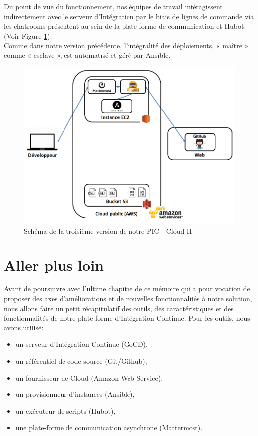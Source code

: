       Du point de vue du fonctionnement, nos équipes de travail intéragissent indirectement avec le serveur d'Intégration par le biais de lignes de commande via les chatrooms présentent au sein de la plate-forme de communication et Hubot (Voir Figure \ref{PICv3}).\\

      Comme dans notre version précédente, l'intégralité des déploiements, « maître » comme « esclave », est automatisé et géré par Ansible.

      \begin{figure}
        \begin{center}
          \includegraphics[scale=0.5]{images/PICv3.png}
        \end{center}
        \caption{Schéma de la troisième version de notre PIC - Cloud II}
        \label{PICv3}
      \end{figure}

      \section{Aller plus loin}
      Avant de poursuivre avec l'ultime chapitre de ce mémoire qui a pour vocation de proposer des axes d'améliorations et de nouvelles fonctionnalités à notre solution, nous allons faire un petit récapitulatif des outils, des caractéristiques et des fonctionnalités de notre plate-forme d'Intégration Continue. Pour les outils, nous avons utilisé:\\

      \begin{itemize}
        \item un serveur d'Intégration Continue (GoCD),
        \item un référentiel de code source (Git/Github),
        \item un fournisseur de Cloud (Amazon Web Service),
        \item un provisionneur d'instances (Ansible),
        \item un exécuteur de scripts (Hubot),
        \item une plate-forme de communication asynchrone (Mattermost).\\
      \end{itemize}

